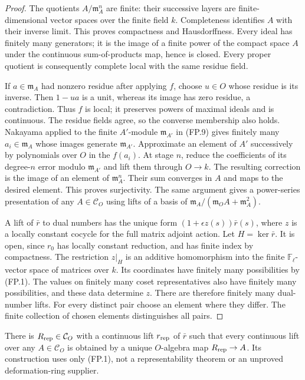 \begin{proof}
The quotients $A/\mathfrak m_A^n$ are finite: their successive
layers are finite-dimensional vector spaces over the finite field
$k$.  Completeness identifies $A$ with their inverse limit.
This proves compactness and Hausdorffness.  Every ideal has finitely
many generators; it is the image of a finite power of the compact
space $A$ under the continuous sum-of-products map, hence is closed.
Every proper quotient is consequently complete local with the same
residue field.

If $a\in\mathfrak m_A$ had nonzero residue after applying $f$,
choose $u\in O$ whose residue is its inverse.  Then $1-ua$ is a
unit, whereas its image has zero residue, a contradiction.  Thus
$f$ is local; it preserves powers of maximal ideals and is continuous.
The residue fields agree, so the converse membership also holds.
Nakayama applied to the finite $A'$-module $\mathfrak m_{A'}$
in (FP.9) gives finitely many $a_i\in\mathfrak m_A$ whose images
generate $\mathfrak m_{A'}$.  Approximate an element of $A'$
successively by polynomials over $O$ in the $f(a_i)$.
At stage $n$, reduce the coefficients of its degree-$n$ error
modulo $\mathfrak m_{A'}$ and lift them through $O\to k$.
The resulting correction is the image of an element of
$\mathfrak m_A^n$.  Their sum converges in $A$ and maps to the
desired element.  This proves surjectivity.
The same argument gives a power-series presentation of any
$A\in\mathcal C_O$ using lifts of a basis of
$\mathfrak m_A/(\mathfrak m_OA+\mathfrak m_A^2)$.

A lift of $\bar r$ to dual numbers has the unique form
$(1+\epsilon z(s))\bar r(s)$, where $z$ is a locally constant
cocycle for the full matrix adjoint action.
Let $H=\ker\bar r$.  It is open, since $r_0$ has locally constant
reduction, and has finite index by compactness.
The restriction $z|_H$ is an additive homomorphism into the finite
$\mathbb F_\ell$-vector space of matrices over $k$.
Its coordinates have finitely many possibilities by (FP.1).
The values on finitely many coset representatives also have
finitely many possibilities, and these data determine $z$.
There are therefore finitely many dual-number lifts.
For every distinct pair choose an element where they differ.
The finite collection of chosen elements distinguishes all pairs.
\end{proof}

\begin{proposition}
\label{claim:FP2}
There is $R_{\rm rep}\in\mathcal C_O$ with a continuous lift
$r_{\rm rep}$ of $\bar r$ such that every continuous lift over any
$A\in\mathcal C_O$ is obtained by a unique $O$-algebra map
$R_{\rm rep}\to A$.  Its construction uses only (FP.1), not a
representability theorem or an unproved deformation-ring supplier.
\end{proposition}

